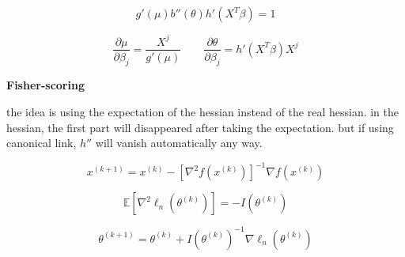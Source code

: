 \documentclass[12pt,a4paper]{article}
\begin{document}
\[
g'(\mu)b''(\theta)h'(X^T\beta)=1
\]

\[
\frac{\partial \mu}{\partial \beta_j}= \frac{X^j}{g'(\mu)}  \quad\quad  \frac{\partial \theta}{\partial \beta_j} = h'(X^T \beta ) X^j
\]


\textbf{Fisher-scoring}

the idea is using the expectation of the hessian instead of the real hessian. in the hessian, the first part will disappeared after taking the expectation. but if using canonical link, $h''$ will vanish automatically any way.

\[
	x^{(k+1)} = x^{(k)} - [\nabla^2 f(x^{(k)})]^{-1}\nabla f(x^{(k)})
\]


\[
	\mathbb{E}[\nabla^2 \ell_n(\theta^{(k)})] = -I(\theta^{(k)})
\]

\[
\theta^{(k+1)} = \theta^{(k)} + I(\theta^{(k)})^{-1}\nabla \ell_n(\theta^{(k)})
\]
\end{document}

